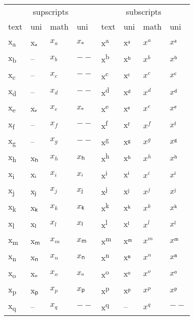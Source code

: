 \documentclass{standalone}
\begin{document}
\begin{tabular}{ll|ll|ll|ll}
\toprule
\multicolumn{4}{c|}{supscripts} & \multicolumn{4}{|c}{subscripts} \\
text & uni & math & uni & text & uni & math & uni \\
\midrule
x\textsubscript{a} & xₐ & $x_{a}$ & $xₐ$ & x\textsuperscript{a} & xᵃ & $x^{a}$ & $xᵃ$ \\
x\textsubscript{b} & -- & $x_{b}$ & $--$ & x\textsuperscript{b} & xᵇ & $x^{b}$ & $xᵇ$ \\
x\textsubscript{c} & -- & $x_{c}$ & $--$ & x\textsuperscript{c} & xᶜ & $x^{c}$ & $xᶜ$ \\
x\textsubscript{d} & -- & $x_{d}$ & $--$ & x\textsuperscript{d} & xᵈ & $x^{d}$ & $xᵈ$ \\
x\textsubscript{e} & xₑ & $x_{e}$ & $xₑ$ & x\textsuperscript{e} & xᵉ & $x^{e}$ & $xᵉ$ \\
x\textsubscript{f} & -- & $x_{f}$ & $--$ & x\textsuperscript{f} & xᶠ & $x^{f}$ & $xᶠ$ \\
x\textsubscript{g} & -- & $x_{g}$ & $--$ & x\textsuperscript{g} & xᵍ & $x^{g}$ & $xᵍ$ \\
x\textsubscript{h} & xₕ & $x_{h}$ & $xₕ$ & x\textsuperscript{h} & xʰ & $x^{h}$ & $xʰ$ \\
x\textsubscript{i} & xᵢ & $x_{i}$ & $xᵢ$ & x\textsuperscript{i} & xⁱ & $x^{i}$ & $xⁱ$ \\
x\textsubscript{j} & xⱼ & $x_{j}$ & $xⱼ$ & x\textsuperscript{j} & xʲ & $x^{j}$ & $xʲ$ \\
x\textsubscript{k} & xₖ & $x_{k}$ & $xₖ$ & x\textsuperscript{k} & xᵏ & $x^{k}$ & $xᵏ$ \\
x\textsubscript{l} & xₗ & $x_{l}$ & $xₗ$ & x\textsuperscript{l} & xˡ & $x^{l}$ & $xˡ$ \\
x\textsubscript{m} & xₘ & $x_{m}$ & $xₘ$ & x\textsuperscript{m} & xᵐ & $x^{m}$ & $xᵐ$ \\
x\textsubscript{n} & xₙ & $x_{n}$ & $xₙ$ & x\textsuperscript{n} & xⁿ & $x^{n}$ & $xⁿ$ \\
x\textsubscript{o} & xₒ & $x_{o}$ & $xₒ$ & x\textsuperscript{o} & xᵒ & $x^{o}$ & $xᵒ$ \\
x\textsubscript{p} & xₚ & $x_{p}$ & $xₚ$ & x\textsuperscript{p} & xᵖ & $x^{p}$ & $xᵖ$ \\
x\textsubscript{q} & -- & $x_{q}$ & $--$ & x\textsuperscript{q} & -- & $x^{q}$ & $--$ \\

\end{tabular}
\end{document}
